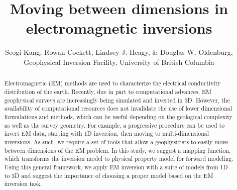 \documentclass{segabs}
\newcommand{\SimPEG}{\textsc{SimPEG}\xspace}
\newcommand{\simpegEM}{\textsc{simpegEM}\xspace}
\begin{document}
\title{Moving between dimensions in electromagnetic inversions}

\renewcommand{\thefootnote}{\fnsymbol{footnote}}

\author{Seogi Kang\footnotemark[1], Rowan Cockett, Lindsey J. Heagy, \& Douglas W. Oldenburg, Geophysical Inversion Facility, University of British Columbia}


\maketitle
\begin{abstract}
Electromagnetic (EM) methods are used to characterize the electrical conductivity distribution of the earth. Recently, due in part to computational advances, EM geophysical surveys are increasingly being simulated and inverted in 3D. However, the availability of computational resources does not invalidate the use of lower dimensional formulations and methods, which can be useful depending on the geological complexity as well as the survey geometry. For example, a progressive procedure can be used to invert EM data, starting with 1D inversion, then moving to multi-dimensional inversions. As such, we require a set of tools that allow a geophysicists to easily move between dimensions of the EM problem. In this study, we suggest a mapping function, which transforms the inversion model to physical property model for forward modeling. Using this general framework, we apply EM inversion with a suite of models from 1D to 3D and suggest the importance of choosing a proper model based on the EM inversion task.
\end{abstract}
\renewcommand{\figdir}{Fig} %
\end{document}

